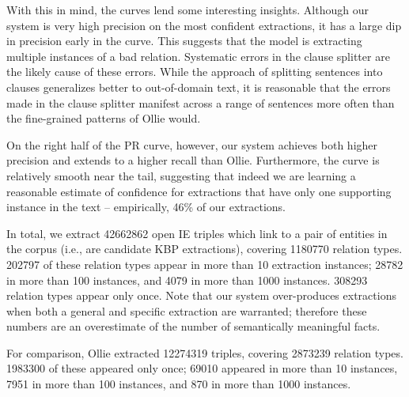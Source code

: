 With this in mind, the curves lend some interesting insights.
Although our system is very high precision on the most confident extractions,
  it has a large dip in precision early in the curve.
This suggests that the model is extracting multiple instances of a bad
  relation.
Systematic errors in the clause splitter are the likely cause of these errors.
While the approach of splitting sentences into clauses generalizes better
  to out-of-domain text, it is reasonable that the errors made in the
  clause splitter manifest across a range of sentences more often than
  the fine-grained patterns of Ollie would.

On the right half of the PR curve, however, our system achieves both higher precision
  and extends to a higher recall than Ollie.
Furthermore, the curve is relatively smooth near the tail, suggesting
  that indeed we are learning a reasonable estimate of confidence for
  extractions that have only one supporting instance in the text
  -- empirically, 46\% of our extractions.

In total, we extract \num{42662862} open IE triples which link to a pair
  of entities in the corpus (i.e., are candidate KBP extractions),
  covering \num{1180770} relation types.
\num{202797} of these relation types appear in more than 10 extraction instances;
  \num{28782} in more than 100 instances, and \num{4079} in more than 1000 instances.
\num{308293} relation types appear only once.
Note that our system
  over-produces extractions when both a general and specific extraction are
  warranted; therefore these numbers are an overestimate of the number
  of semantically meaningful facts.

For comparison, Ollie extracted \num{12274319} triples, covering
  \num{2873239} relation types.
\num{1983300} of these appeared only once;
  \num{69010} appeared in more than 10 instances, \num{7951} in more than 100
  instances, and \num{870} in more than 1000 instances.
    







%

